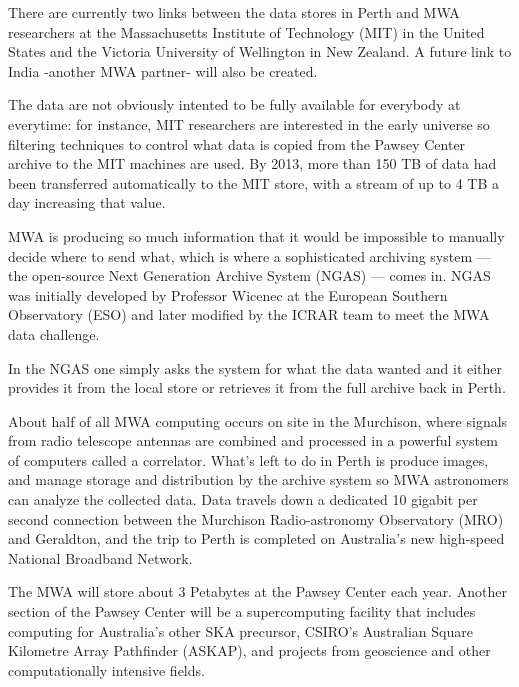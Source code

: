There are currently two links between the data stores in Perth and MWA researchers at the Massachusetts Institute of Technology (MIT) in the United States and the Victoria University of Wellington in New Zealand. A future link to India -another MWA partner- will also be created. \newline

The data are not obviously intented to be fully available for everybody at everytime: for instance, MIT researchers are interested in the early universe so filtering techniques to control what data is copied from the Pawsey Center archive to the MIT machines are used. By 2013, more than 150 TB of data had been transferred automatically to the MIT store, with a stream of up to 4 TB a day increasing that value. \newline

MWA is producing so much information that it would be impossible to manually decide where to send what, which is where a sophisticated archiving system — the open-source Next Generation Archive System (NGAS) — comes in. NGAS was initially developed by Professor Wicenec at the European Southern Observatory (ESO) and later modified by the ICRAR team to meet the MWA data challenge. \newline

In the NGAS one simply asks the system for what the data wanted and it either provides it from the local store or retrieves it from the full archive back in Perth. \newline

About half of all MWA computing occurs on site in the Murchison, where signals from radio telescope antennas are combined and processed in a powerful system of computers called a correlator. What's left to do in Perth is produce images, and manage storage and distribution by the archive system so MWA astronomers can analyze the collected data. Data travels down a dedicated 10 gigabit per second connection between the Murchison Radio-astronomy Observatory (MRO) and Geraldton, and the trip to Perth is completed on Australia’s new high-speed National Broadband Network. \newline

The MWA will store about 3 Petabytes at the Pawsey Center each year. Another section of the Pawsey Center will be a supercomputing facility that includes computing for Australia's other SKA precursor, CSIRO’s Australian Square Kilometre Array Pathfinder (ASKAP), and projects from geoscience and other computationally intensive fields. \newline

